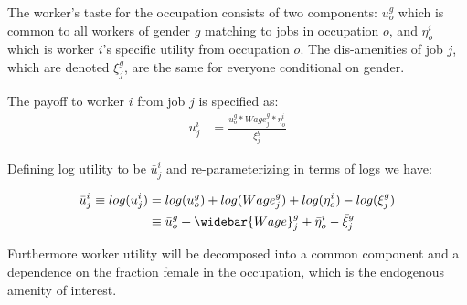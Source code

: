 \documentclass[12pt]{article}
\begin{document}
The worker's taste for the occupation consists of two components: $u^g_o$ which is common to all workers of gender $g$ matching to jobs in occupation $o$, and $\eta^i_o$ which is worker $i$'s specific utility from occupation $o$. The dis-amenities of job $j$, which are denoted $\xi^g_j$, are the same for everyone conditional on gender.


The payoff to worker $i$ from job $j$ is specified as:
\begin{align} \label{worker}
u^i_j &= \frac{ u^g_o*Wage^g_j *  \eta^i_o } {\xi^g_j}    
\end{align}

Defining log utility to be $\bar{u}^{i}_j$ and re-parameterizing in terms of logs we have:

\begin{align} \label{logworker}
\bar{u}^{i}_j \equiv log(u^i_j) &= log(u^g_o) + log(Wage^g_j)  + log(\eta^i_o) - log(\xi^g_j)   \\ \nonumber
&\equiv  \bar{u}^{g}_o + \widebar{Wage}^g_j   + \bar{\eta}^i_o - \bar{\xi}^g_j 
\end{align}





Furthermore worker utility will be decomposed into a common component and a dependence on the fraction female in the occupation, which is the endogenous amenity of interest. 
\end{document}
